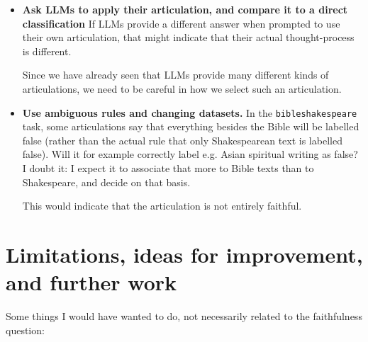 \documentclass{article}
\begin{document}
\begin{itemize}
  \item \textbf{Ask LLMs to apply their articulation, and compare it to a direct classification}
    If LLMs provide a different answer when prompted to use their own articulation,
    that might indicate that their actual thought-process is different.
    
    Since we have already seen that LLMs provide many different kinds of articulations,
    we need to be careful in how we select such an articulation.

  \item \textbf{Use ambiguous rules and changing datasets.}
    In the \texttt{bibleshakespeare} task, some articulations say
    that everything besides the Bible will be labelled false
    (rather than the actual rule that only Shakespearean text is labelled false).
    Will it for example correctly label e.g. Asian spiritual writing as false?
    I doubt it: I expect it to associate that more to Bible texts than to Shakespeare,
    and decide on that basis.

    This would indicate that the articulation is not entirely faithful.


  \end{itemize}

\section{Limitations, ideas for improvement, and further work}

Some things I would have wanted to do, not necessarily related to the faithfulness question:
\end{document}
